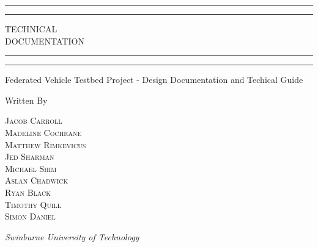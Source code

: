 \documentclass{report}
\begin{document}
\begin{titlepage}
  \centering
  \scshape
  \vspace*{\baselineskip}


  \rule{\textwidth}{1.6pt}\vspace*{-\baselineskip}\vspace*{2pt} %
	\rule{\textwidth}{0.4pt} %

	\vspace{0.75\baselineskip} %

	{\LARGE TECHNICAL\\ DOCUMENTATION\\} %

	\vspace{0.75\baselineskip} %

	\rule{\textwidth}{0.4pt}\vspace*{-\baselineskip}\vspace{3.2pt} %
	\rule{\textwidth}{1.6pt} %

	\vspace{2\baselineskip} %


	Federated Vehicle Testbed Project - Design Documentation and Techical Guide %

	\vspace*{3\baselineskip} %


	Written By

	\vspace{0.5\baselineskip} %

	{\scshape\Large
  Jacob Carroll \\
	Madeline Cochrane \\
	Matthew Rimkevicus \\
	Jed Sharman \\
	Michael Shim \\
	Aslan Chadwick \\
	Ryan Black \\
	Timothy Quill \\
	Simon Daniel} %

	\vspace{0.5\baselineskip} %

	\textit{Swinburne University of Technology} %

	\vfill %
\end{titlepage}
\end{document}
